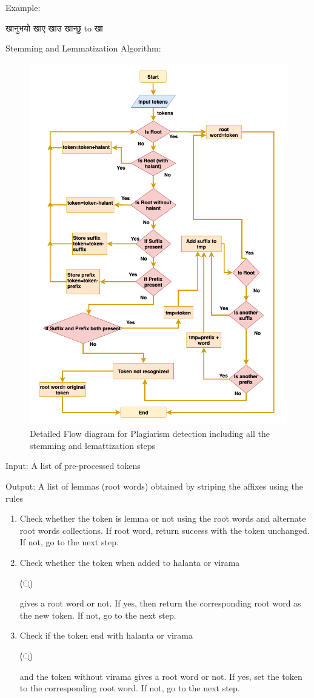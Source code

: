 \documentclass[conference]{IEEEtran}
\begin{document}
\begin{enumerate}
Example: \begin{sanskrit} खानुभयो खाए खाउ खान्छु to खा  \end{sanskrit}
\medskip

Stemming and Lemmatization Algorithm:

\begin{figure}[htbp]
\centering
\includegraphics[width=0.45 \textwidth]{figures/stemming.png}
\caption{Detailed Flow diagram for Plagiarism detection including all the
stemming and lemattization steps}
\label{stemming}
\end{figure}

\medskip
Input: A list of pre-processed tokens 

\medskip
Output: A list of lemmas (root words) obtained by striping the affixes using the rules
\medskip

\begin{enumerate}

    \item Check whether the token is lemma or not using the root words and
      alternate root words collections. If root word, return success with the
      token unchanged. If not, go to the next step. \medskip
    
    \item Check whether the token when added to halanta or virama
      \begin{sanskrit}(्)\end{sanskrit} gives a root word or not. If yes, then
      return the corresponding root word as the new token. If not, go to the
      next step.\medskip
    
    \item Check if the token end with halanta or virama
      \begin{sanskrit}(्)\end{sanskrit} and the token without virama gives a root
      word or not. If yes, set the token to the corresponding root word. If not,
      go to the next step.\medskip
    

\end{enumerate}
\end{enumerate}
\end{document}
